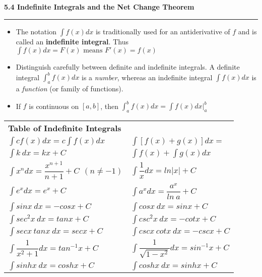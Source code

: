 \documentclass[fleqn]{article}
\begin{document}
\begin{center}
\Large\textbf{5.4 Indefinite Integrals and the Net Change Theorem}

\noindent\hfill\rule{0.3\textwidth}{.4pt}\hfill
\vspace{12pt}
\large

\begin{itemize}
	\item The notation $\int f(x) dx$ is traditionally used for an antiderivative of $f$ and is called an \textbf{indefinite integral}. Thus $\int f(x) dx = F(x) \text{ means } F'(x) = f(x)$
	\item Distinguish carefully between definite and indefinite integrals. A definite integral $\int_a^b f(x) dx$ is a \textit{number}, whereas an indefinite integral $\int f(x) dx$ is a \textit{function} (or family of functions).
	\item If $f$ is continuous on $[a,b]$, then $\int_a^b f(x) dx = \int f(x) dx \big|_a^b$
\end{itemize}
\vspace{24pt}

\Large
\def\arraystretch{1.3}
{\setlength{\tabcolsep}{16pt}
\begin{tabularx}{.9\textwidth}{|X X|}
\hline
	\large\textbf{Table of Indefinite Integrals} & \\[5pt]
	$\int cf(x)dx = c \int f(x)dx$ & $\int [f(x) + g(x)]dx =$ \\[10pt]
	$\int k \> dx = kx + C$ & $\int f(x) + \int g(x)dx$ \\[10pt] 
	$\int x^n dx = \dfrac{x^{n+1}}{n+1} + C \hspace{5pt} (n \ne -1)$ & $\int \dfrac{1}{x} dx = ln|x| + C$ \\[10pt]
	$\int e^x dx = e^x + C$ & $\int a^x dx = \dfrac{a^x}{ln \> a} + C$ \\[10pt]
	$\int sinx\>dx = -cosx + C$ & $\int cosx\>dx = sinx +C$ \\[10pt]
	$\int sec^2x\>dx = tanx + C$ & $\int csc^2x\>dx = -cotx + C$ \\[10pt]
	$\int secx\>tanx\>dx = secx +C$ & $\int cscx\>cotx\>dx = -cscx + C$ \\[10pt]
	$\int \dfrac{1}{x^2+1} dx = tan^{-1}x + C$ & $\int \dfrac{1}{\sqrt{1-x^2}} dx = sin^{-1} x + C$ \\[10pt]
	$\int sinhx \> dx = coshx + C$ & $\int coshx \> dx = sinhx + C$\\[10pt]
\hline
\end{tabularx}}
\vspace{24pt}


\end{center}
\end{document}
